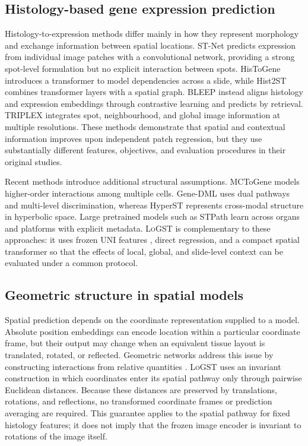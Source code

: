 \documentclass[10pt,twocolumn,letterpaper]{article}
\newcommand{\morph}{\textsc{LoGST}}
\begin{document}
\subsection{Histology-based gene expression prediction}
Histology-to-expression methods differ mainly in how they represent morphology and exchange
information between spatial locations. ST-Net \cite{he2020stnet} predicts expression from individual
image patches with a convolutional network, providing a strong spot-level formulation but no
explicit interaction between spots. HisToGene \cite{pang2021histogene} introduces a transformer to
model dependencies across a slide, while Hist2ST \cite{zeng2022hist2st} combines transformer layers
with a spatial graph. BLEEP \cite{xie2023bleep} instead aligns histology and expression embeddings
through contrastive learning and predicts by retrieval. TRIPLEX \cite{chung2024triplex} integrates
spot, neighbourhood, and global image information at multiple resolutions. These methods demonstrate
that spatial and contextual information improves upon independent patch regression, but they use
substantially different features, objectives, and evaluation procedures in their original studies.

Recent methods introduce additional structural assumptions. MCToGene \cite{sun2026mctogene} models
higher-order interactions among multiple cells. Gene-DML \cite{song2026genedml} uses dual pathways
and multi-level discrimination, whereas HyperST \cite{zhang2026hyperst} represents cross-modal
structure in hyperbolic space. Large pretrained models such as STPath \cite{stpath2025} learn across
organs and platforms with explicit metadata. \morph{} is complementary to these approaches: it uses
frozen UNI features \cite{chen2024uni}, direct regression, and a compact spatial transformer so that
the effects of local, global, and slide-level context can be evaluated under a common protocol.

\subsection{Geometric structure in spatial models}
Spatial prediction depends on the coordinate representation supplied to a model. Absolute position
embeddings can encode location within a particular coordinate frame, but their output may change
when an equivalent tissue layout is translated, rotated, or reflected. Geometric networks address
this issue by constructing interactions from relative quantities \cite{satorras2021egnn}. \morph{}
uses an invariant construction in which coordinates enter its spatial pathway only through pairwise
Euclidean distances. Because these distances are preserved by translations, rotations, and
reflections, no transformed coordinate frames or prediction averaging are required. This guarantee
applies to the spatial pathway for fixed histology features; it does not imply that the frozen image
encoder is invariant to rotations of the image itself.
\end{document}
